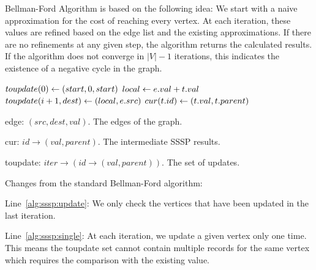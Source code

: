 
Bellman-Ford Algorithm \cite{bellman1958routing,ford1956network} is based on
the following idea: We start with a naive approximation for the cost of
reaching every vertex. At each iteration, these values are refined based on
the edge list and the existing approximations. If there are no refinements at
any given step, the algorithm returns the calculated results. If the algorithm
does not converge in $|V|-1$ iterations, this indicates the existence of a
negative cycle in the graph.


\begin{algorithm} \label{alg:sssp}
\begin{algorithmic}[1]
	\State $toupdate(0) \leftarrow (start,0,start)$
		 \label{alg:sssp:update}
		 		\State $local \leftarrow e.val + t.val$
		 		 \label{alg:sssp:single}
		 			\State $toupdate(i+1,dest) \leftarrow (local,e.src)$
		 		\EndIf
			\EndFor
		\EndFor
		 		\State $cur(t.id) \leftarrow (t.val,t.parent)$
		 	\EndIf
		\EndFor
	\EndFor
\end{algorithmic}
\end{algorithm}

\begin{description}
\item edge: $(src,dest,val)$. The edges of the graph.
\item cur: $id \rightarrow (val,parent)$. The intermediate SSSP results.
\item toupdate: $iter \rightarrow (id \rightarrow (val,parent))$. The set of updates.
\end{description}

Changes from the standard Bellman-Ford algorithm:

\begin{description}
\item Line~\ref{alg:sssp:update}: We only check the vertices that have been
updated in the last iteration.
\item Line~\ref{alg:sssp:single}: At each iteration, we update a given vertex
only one time. This means the toupdate set cannot contain multiple records
for the same vertex which requires the comparison with the existing value.
\end{description}

